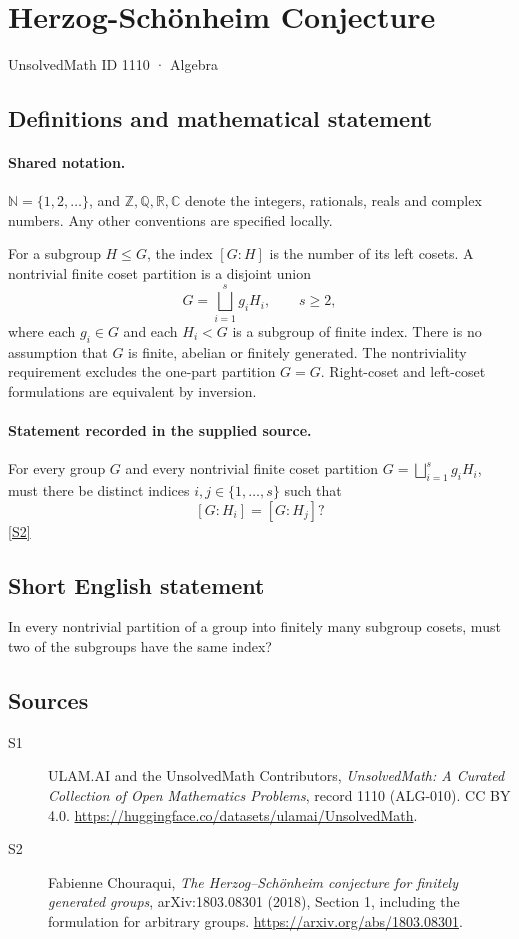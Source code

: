 \documentclass[11pt]{article}
\newcommand{\sref}[2]{\hyperlink{source:#1:#2}{[S#2]}}
\begin{document}
\setcounter{section}{1109}
\section{Herzog-Schönheim Conjecture}\label{1110}
{\small\sffamily UnsolvedMath ID 1110 · Algebra}
\subsection{Definitions and mathematical statement}

\paragraph{Shared notation.}$\mathbb N=\{1,2,\ldots\}$, and $\mathbb Z,\mathbb Q,\mathbb R,\mathbb C$ denote the integers, rationals, reals and complex numbers. Any other conventions are specified locally.


For a subgroup \(H\le G\), the index \([G:H]\) is the number of its
left cosets.  A nontrivial finite coset partition is a disjoint union
\[
 G=\bigsqcup_{i=1}^{s} g_iH_i,\qquad s\ge2,
\]
where each \(g_i\in G\) and each \(H_i<G\) is a subgroup of finite index.
There is no assumption that \(G\) is finite, abelian or finitely generated.
The nontriviality requirement excludes the one-part partition \(G=G\).
Right-coset and left-coset formulations are equivalent by inversion.
\paragraph{Statement recorded in the supplied source.}
For every group \(G\) and every nontrivial finite coset partition
\(G=\bigsqcup_{i=1}^{s}g_iH_i\), must there be distinct indices
\(i,j\in\{1,\ldots,s\}\) such that
\[
 [G:H_i]=[G:H_j]?
\] \sref{1110}{2}
\subsection{Short English statement}
In every nontrivial partition of a group into finitely many subgroup cosets, must two of the subgroups have the same index?
\subsection{Sources}
\begin{description}
\item[\hypertarget{source:1110:1}{S1}] ULAM.AI and the UnsolvedMath Contributors, \emph{UnsolvedMath: A Curated Collection of Open Mathematics Problems}, record 1110 (ALG-010). CC BY 4.0. \url{https://huggingface.co/datasets/ulamai/UnsolvedMath}.
\item[\hypertarget{source:1110:2}{S2}] Fabienne Chouraqui, \emph{The Herzog--Sch\"onheim conjecture for finitely generated groups}, arXiv:1803.08301 (2018), Section 1, including the formulation for arbitrary groups. \url{https://arxiv.org/abs/1803.08301}.
\end{description}
\label{end:1110}
\end{document}
